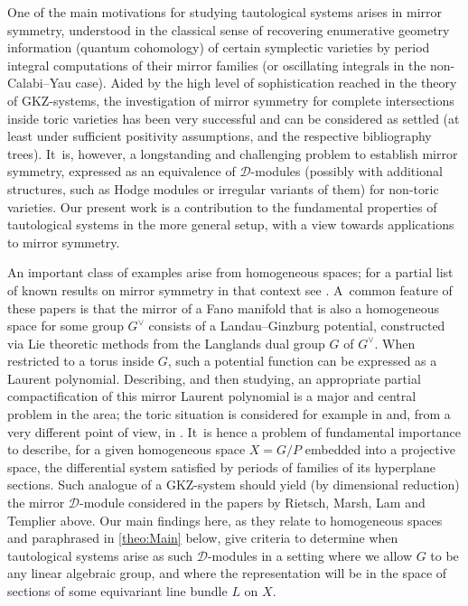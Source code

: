 \documentclass[JEP,XML,SOM,Unicode,published]{cedram}
\newcommand{\cD}{\mathscr{D}}
\begin{document}
One of the main motivations for studying
tautological systems arises in mirror symmetry, understood in the
classical sense of recovering enumerative geometry information (\ie quantum cohomology) of certain symplectic varieties by period integral
computations of their mirror families (or oscillating integrals in the
non-Calabi--Yau case). Aided by the high level of
sophistication reached in the theory of GKZ-systems, the
investigation of mirror symmetry for
complete intersections inside toric varieties has been very
successful and can be considered as
settled (at least under sufficient positivity assumptions, \cf \cite{Giv7, Iritani, RS12} and the respective bibliography trees). It~is, however, a longstanding and
challenging problem to establish mirror symmetry, expressed as an
equivalence of $\mathscr{D}$\nobreakdash-mod\-ules (possibly with additional
structures, such as Hodge modules or irregular variants of them) for
non-toric varieties. Our present work is a contribution to the
fundamental properties of tautological systems in the more general
setup, with a view towards applications to mirror symmetry.

An important class of examples arise from homogeneous spaces; for a
partial list of known results on mirror symmetry in that context see
\cite{Rietsch, Marsh-Rietsch, Lam-Templier}. A~common feature of these
papers is that the mirror of a Fano manifold that is
also a homogeneous space for some group $G^\vee$ consists of a
Landau--Ginzburg potential, constructed via Lie theoretic methods from
the Langlands dual group $G$ of $G^\vee$. When restricted to a torus
inside $G$, such a potential function can be expressed as a Laurent
polynomial. Describing, and then studying, an appropriate partial
compactification of this mirror Laurent polynomial is a major and
central problem in the area; the toric situation is considered for
example in \cite{RS12} and, from a very different point of view, in
\cite{Siebert-TropLG}. It~is hence a problem of fundamental importance to
describe, for a given homogeneous space $X=G/P$ embedded into a
projective space, the differential system satisfied by periods of
families of its hyperplane sections. Such analogue
of a GKZ-system should yield (by dimensional reduction) the
mirror $\mathscr{D}$\nobreakdash-mod\-ule considered in the papers by Rietsch,
Marsh, Lam and Templier above.
Our main findings here, as they relate to homogeneous
spaces and
paraphrased in \cref{theo:Main} below, give criteria to determine when
tautological systems arise as such $\cD$\nobreakdash-mod\-ules in a setting where we
allow $G$ to be any linear algebraic group, and where the
representation will be in the space of sections of some equivariant
line bundle $L$ on $X$.
\end{document}
